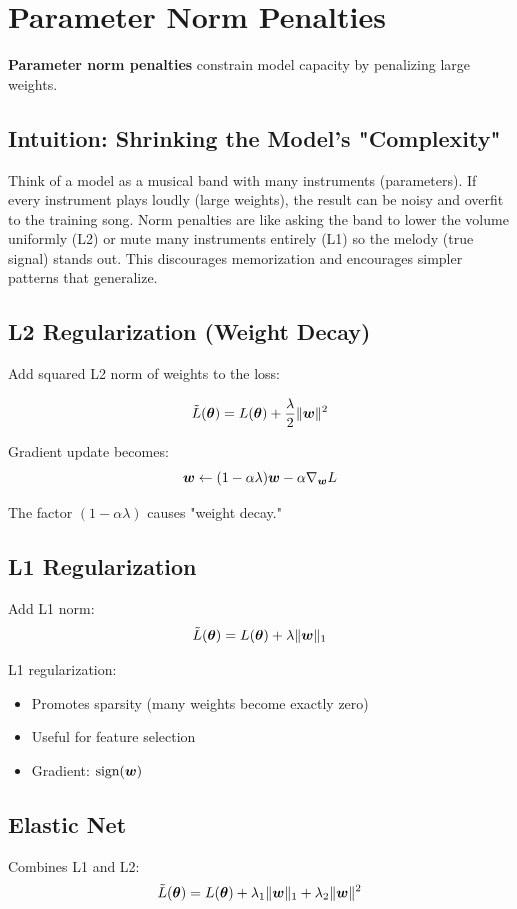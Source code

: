 
\section{Parameter Norm Penalties}
\label{sec:parameter-penalties}

\textbf{Parameter norm penalties} constrain model capacity by penalizing large weights.

\subsection{Intuition: Shrinking the Model's "Complexity"}

Think of a model as a musical band with many instruments (parameters). If every instrument plays loudly (large weights), the result can be noisy and overfit to the training song. Norm penalties are like asking the band to lower the volume uniformly (L2) or mute many instruments entirely (L1) so the melody (true signal) stands out. This discourages memorization and encourages simpler patterns that generalize.

\subsection{L2 Regularization (Weight Decay)}

Add squared L2 norm of weights to the loss:

\begin{equation}
\tilde{L}(\boldsymbol{\theta}) = L(\boldsymbol{\theta}) + \frac{\lambda}{2} \|\boldsymbol{w}\|^2
\end{equation}

Gradient update becomes:
\begin{equation}
\boldsymbol{w} \leftarrow (1 - \alpha\lambda)\boldsymbol{w} - \alpha \nabla_{\boldsymbol{w}} L
\end{equation}

The factor $(1 - \alpha\lambda)$ causes "weight decay."

\subsection{L1 Regularization}

Add L1 norm:
\begin{equation}
\tilde{L}(\boldsymbol{\theta}) = L(\boldsymbol{\theta}) + \lambda \|\boldsymbol{w}\|_1
\end{equation}

L1 regularization:
\begin{itemize}
    \item Promotes sparsity (many weights become exactly zero)
    \item Useful for feature selection
    \item Gradient: $\text{sign}(\boldsymbol{w})$
\end{itemize}


\subsection{Elastic Net}

Combines L1 and L2:
\begin{equation}
\tilde{L}(\boldsymbol{\theta}) = L(\boldsymbol{\theta}) + \lambda_1 \|\boldsymbol{w}\|_1 + \lambda_2 \|\boldsymbol{w}\|^2
\end{equation}

